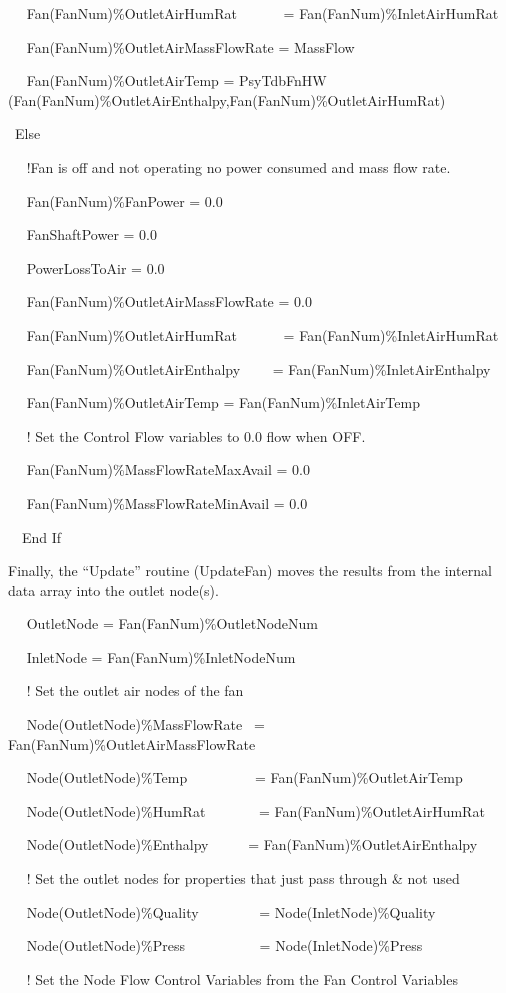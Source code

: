 ~~ Fan(FanNum)\%OutletAirHumRat~~~~~~ = Fan(FanNum)\%InletAirHumRat

~~ Fan(FanNum)\%OutletAirMassFlowRate = MassFlow

~~ Fan(FanNum)\%OutletAirTemp = PsyTdbFnHW (Fan(FanNum)\%OutletAirEnthalpy,Fan(FanNum)\%OutletAirHumRat)

~Else

~~ !Fan is off and not operating no power consumed and mass flow rate.

~~ Fan(FanNum)\%FanPower = 0.0

~~ FanShaftPower = 0.0

~~ PowerLossToAir = 0.0

~~ Fan(FanNum)\%OutletAirMassFlowRate = 0.0

~~ Fan(FanNum)\%OutletAirHumRat~~~~~~ = Fan(FanNum)\%InletAirHumRat

~~ Fan(FanNum)\%OutletAirEnthalpy~~~~ = Fan(FanNum)\%InletAirEnthalpy

~~ Fan(FanNum)\%OutletAirTemp = Fan(FanNum)\%InletAirTemp

~~ ! Set the Control Flow variables to 0.0 flow when OFF.

~~ Fan(FanNum)\%MassFlowRateMaxAvail = 0.0

~~ Fan(FanNum)\%MassFlowRateMinAvail = 0.0

~~End If

Finally, the ``Update'' routine (UpdateFan) moves the results from the internal data array into the outlet node(s).

~~ OutletNode = Fan(FanNum)\%OutletNodeNum

~~ InletNode = Fan(FanNum)\%InletNodeNum

~~ ! Set the outlet air nodes of the fan

~~ Node(OutletNode)\%MassFlowRate~ = Fan(FanNum)\%OutletAirMassFlowRate

~~ Node(OutletNode)\%Temp~~~~~~~~~ = Fan(FanNum)\%OutletAirTemp

~~ Node(OutletNode)\%HumRat~~~~~~~ = Fan(FanNum)\%OutletAirHumRat

~~ Node(OutletNode)\%Enthalpy~~~~~ = Fan(FanNum)\%OutletAirEnthalpy

~~ ! Set the outlet nodes for properties that just pass through \& not used

~~ Node(OutletNode)\%Quality~~~~~~~~ = Node(InletNode)\%Quality

~~ Node(OutletNode)\%Press~~~~~~~~~~ = Node(InletNode)\%Press

~~ ! Set the Node Flow Control Variables from the Fan Control Variables


